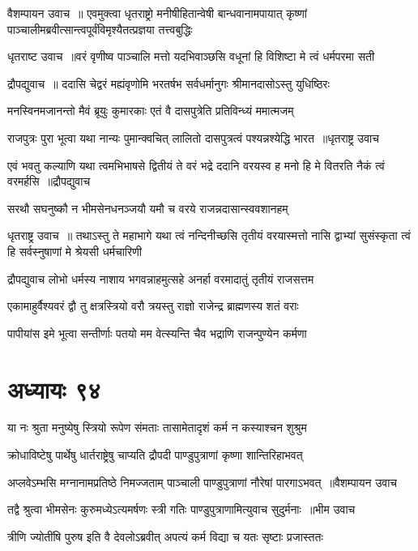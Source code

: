 \twolineshloka
{वैशम्पायन उवाच ॥ एवमुक्त्वा धृतराष्ट्रो मनीषीहितान्वेषी बान्धवानामपायात्}
{कृष्णां पाञ्चालीमब्रवीत्सान्त्वपूर्वंविमृश्यैतत्प्रज्ञया तत्त्वबुद्धिः}


\twolineshloka
{धृतराष्ट उवाच ॥वरं वृणीष्व पाञ्चालि मत्तो यदभिवाञ्छसि}
{वधूनां हि विशिष्टा मे त्वं धर्मपरमा सती}


\twolineshloka
{द्रौपद्युवाच ॥ ददासि चेद्वरं मह्यंवृणोमि भरतर्षभ}
{सर्वधर्मानुगः श्रीमानदासोऽस्तु युधिष्ठिरः}


\twolineshloka
{मनस्विनमजानन्तो मैवं ब्रूयुः कुमारकाः}
{एतं वै दासपुत्रेति प्रतिविन्ध्यं ममात्मजम्}


\twolineshloka
{राजपुत्रः पुरा भूत्वा यथा नान्यः पुमान्क्वचित्}
{लालितो दासपुत्रत्वं पश्यन्नश्येद्धि भारत ॥धृतराष्ट्र उवाच}


\threelineshloka
{एवं भवतु कल्याणि यथा त्वमभिभाषसे}
{द्वितीयं ते वरं भद्रे ददानि वरयस्व ह}
{मनो हि मे वितरति नैकं त्वं वरमर्हसि ॥द्रौपद्युवाच}


\twolineshloka
{सरथौ सघनुष्कौ न भीमसेनधनञ्जयौ}
{यमौ च वरये राजन्नदासान्स्ववशानहम्}


\threelineshloka
{धृतराष्ट्र उवाच ॥ तथाऽस्तु ते महाभागे यथा त्वं नन्दिनीच्छसि}
{तृतीयं वरयास्मत्तो नासि द्वाभ्यां सुसंस्कृता}
{त्वं हि सर्वस्नुषाणां मे श्रेयसी धर्मचारिणी}


\threelineshloka
{द्रौपद्युवाच}
{लोभो धर्मस्य नाशाय भगवन्नाहमुत्सहे}
{अनर्हा वरमादातुं तृतीयं राजसत्तम}


\twolineshloka
{एकामाहुर्वैश्यवरं द्वौ तु क्षत्रस्त्रियो वरौ}
{त्रयस्तु राज्ञो राजेन्द्र ब्राह्मणस्य शतं वराः}


\twolineshloka
{पापीयांस इमे भूत्वा सन्तीर्णाः पतयो मम}
{वेत्स्यन्ति चैव भद्राणि राजन्पुण्येन कर्मणा}


\chapter{अध्यायः ९४}
\twolineshloka
{या नः श्रुता मनुष्येषु स्त्रियो रूपेण संमताः}
{तासामेतादृशं कर्म न कस्याश्चन शुश्रुम}


\twolineshloka
{क्रोधाविष्टेषु पार्थेषु धार्तराष्ट्रेषु चाप्यति}
{द्रौपदी पाण्डुपुत्राणां कृष्णा शान्तिरिहाभवत्}


\twolineshloka
{अप्लवेऽम्भसि मग्नानामप्रतिष्ठे निमज्जताम्}
{पाञ्चाली पाण्डुपुत्राणां नौरेषां पारगाऽभवत् ॥वैशम्पायन उवाच}


\twolineshloka
{तद्वै श्रुत्वा भीमसेनः कुरुमध्येऽत्यमर्षणः}
{स्त्री गतिः पाण्डुपुत्राणामित्युवाच सुदुर्मनाः ॥भीम उवाच}


\twolineshloka
{त्रीणि ज्योतींषि पुरुष इति वै देवलोऽब्रवीत्}
{अपत्यं कर्म विद्या च यतः सृष्टाः प्रजास्ततः}


